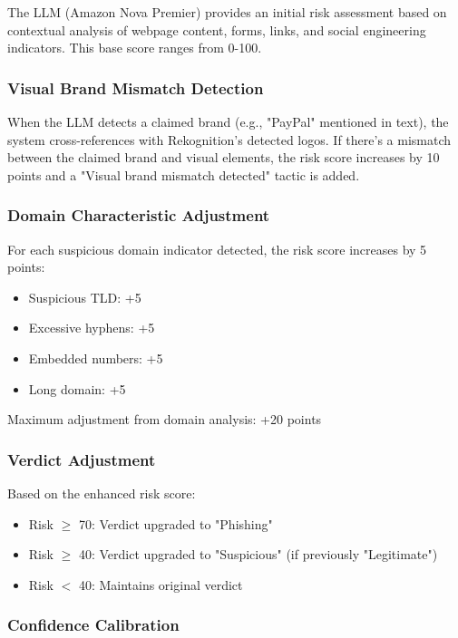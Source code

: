 \documentclass[conference]{IEEEtran}
\begin{document}
The LLM (Amazon Nova Premier) provides an initial risk assessment based on contextual analysis of webpage content, forms, links, and social engineering indicators. This base score ranges from 0-100.

\subsubsection{Visual Brand Mismatch Detection}

When the LLM detects a claimed brand (e.g., "PayPal" mentioned in text), the system cross-references with Rekognition's detected logos. If there's a mismatch between the claimed brand and visual elements, the risk score increases by 10 points and a "Visual brand mismatch detected" tactic is added.

\subsubsection{Domain Characteristic Adjustment}

For each suspicious domain indicator detected, the risk score increases by 5 points:
\begin{itemize}
\item Suspicious TLD: +5
\item Excessive hyphens: +5
\item Embedded numbers: +5
\item Long domain: +5
\end{itemize}

Maximum adjustment from domain analysis: +20 points

\subsubsection{Verdict Adjustment}

Based on the enhanced risk score:
\begin{itemize}
\item Risk $\geq$ 70: Verdict upgraded to "Phishing"
\item Risk $\geq$ 40: Verdict upgraded to "Suspicious" (if previously "Legitimate")
\item Risk $<$ 40: Maintains original verdict
\end{itemize}

\subsubsection{Confidence Calibration}
\end{document}
